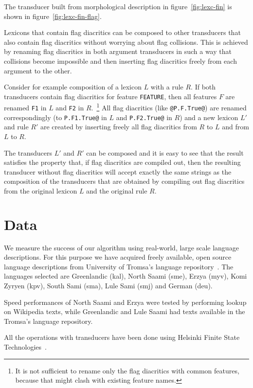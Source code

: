 \documentclass[11pt]{article}
\begin{document}
The transducer built from morphological description in figure~\ref{fig:lexc-fin} is shown in figure~\ref{fig:lexc-fin-flag}. 


Lexicons that contain flag diacritics can be composed to other
transducers that also contain flag diacritics without worrying about
flag collisions. This is achieved by renaming flag diacritics in both
argument transducers in such a way that collisions become impossible
and then inserting flag diacritics freely from each argument to the
other.

Consider for example composition of a lexicon $L$ with a rule $R$. If
both transducers contain flag diacritics for feature {\tt FEATURE},
then all features $F$ are renamed {\tt F1} in $L$ and {\tt F2} in
$R$.~\footnote{It is not sufficient to rename only the flag diacritics
  with common features, because that might clash with existing feature
  names.} All flag diacritics (like {\tt @P.F.True@}) are renamed
correspondingly (to {\tt P.F1.True@} in $L$ and {\tt P.F2.True@} in
$R$) and a new lexicon $L'$ and rule $R'$ are created by inserting
freely all flag diacritics from $R$ to $L$ and from $L$ to $R$.

The transducers $L'$ and $R'$ can be composed and it is easy to
see that the result satisfies the property that, if flag diacritics
are compiled out, then the resulting transducer without flag
diacritics will accept exactly the same strings as the composition of
the transducers that are obtained by compiling out flag diacritics
from the original lexicon $L$ and the original rule $R$.


\section{Data}
\label{sec:data}

We measure the success of our algorithm using real-world, large scale language
descriptions. For this purpose we have acquired freely available, open source
language descriptions from University of Tromsa's language 
repository~\cite{moshagen2013building}. The languages selected are Greenlandic (kal), 
North Saami (sme), Erzya (myv), Komi Zyryen (kpv), South Sami (sma), Lule Sami (smj) and German (deu).

Speed performances of North Saami and Erzya were tested by performing lookup on Wikipedia texts, while Greenlandic and Lule Saami had texts available
 in the Tromsa's language repository.
 
 All the operations with transducers have been done using Helsinki Finite State Technologies~\cite{linden2011}.
\end{document}
